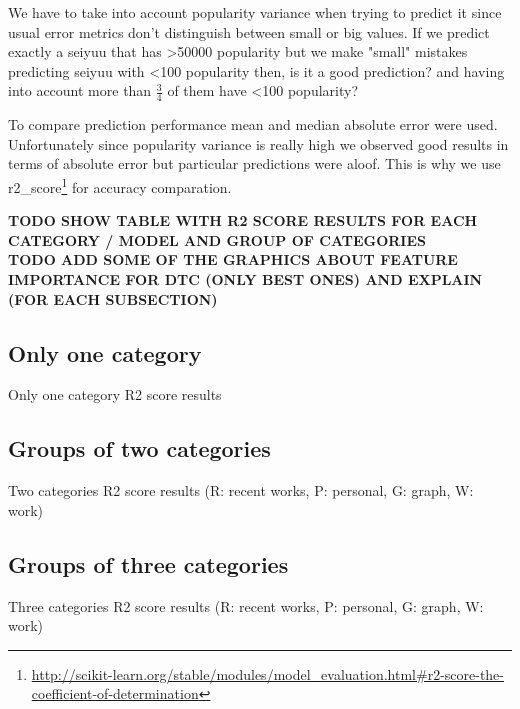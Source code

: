 We have to take into account popularity variance when trying to predict it since usual error metrics don't distinguish between small or big values. If we predict exactly a seiyuu that has \textgreater50000 popularity but we make "small" mistakes predicting seiyuu with \textless100 popularity then, is it a good prediction? and having into account more than $\frac{3}{4}$ of them have \textless100 popularity?

To compare prediction performance mean and median absolute error were used. Unfortunately since popularity variance is really high we observed good results in terms of absolute error but particular predictions were aloof. This is why we use r2\_score\footnote{\url{http://scikit-learn.org/stable/modules/model_evaluation.html#r2-score-the-coefficient-of-determination}} for accuracy comparation. 

\textbf{TODO SHOW TABLE WITH R2 SCORE RESULTS FOR EACH CATEGORY / MODEL AND GROUP OF CATEGORIES}\\
\textbf{TODO ADD SOME OF THE GRAPHICS ABOUT FEATURE IMPORTANCE FOR DTC (ONLY BEST ONES) AND EXPLAIN (FOR EACH SUBSECTION)}

\FloatBarrier
\subsection{Only one category}
\begin{table}[!hbt]
	\begin{center}
	\caption{Only one category R2 score results}
	\label{tab:oneCategory}
	
	\end{center}
\end{table}

\FloatBarrier
\subsection{Groups of two categories}
\begin{table}[!hbt]
	\begin{center}
	\caption{Two categories R2 score results (R: recent works, P: personal, G: graph, W: work)}
	\label{tab:twoCategories}
	
	\end{center}
\end{table}

\FloatBarrier
\subsection{Groups of three categories}
\begin{table}[!hbt]
	\begin{center}
	\caption{Three categories R2 score results (R: recent works, P: personal, G: graph, W: work)}
	\label{tab:threeCategories}
	
	\end{center}
\end{table}

